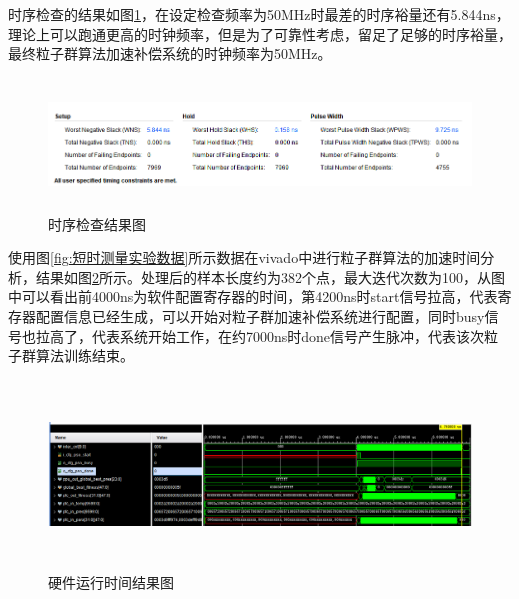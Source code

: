 时序检查的结果如图\ref{fig:时序检查结果图}，在设定检查频率为50MHz时最差的时序裕量还有5.844ns，理论上可以跑通更高的时钟频率，但是为了可靠性考虑，留足了足够的时序裕量，最终粒子群算法加速补偿系统的时钟频率为50MHz。
\begin{figure}[htb]
  \centering
  \includegraphics[width=14cm,height=3.5cm]{fig/6-fig/时序检查结果.png}
  \caption{时序检查结果图}
  \label{fig:时序检查结果图}
\end{figure}

使用图\ref{fig:短时测量实验数据}所示数据在vivado中进行粒子群算法的加速时间分析，结果如图\ref{fig:硬件运行时间结果图}所示。处理后的样本长度约为382个点，最大迭代次数为100，从图中可以看出前4000ns为软件配置寄存器的时间，第4200ns时start信号拉高，代表寄存器配置信息已经生成，可以开始对粒子群加速补偿系统进行配置，同时busy信号也拉高了，代表系统开始工作，在约7000ns时done信号产生脉冲，代表该次粒子群算法训练结束。
\begin{figure}[htb]
  \centering
  \includegraphics[width=14cm,height=5cm]{fig/6-fig/硬件运行时间.png}
  \caption{硬件运行时间结果图}
  \label{fig:硬件运行时间结果图}
\end{figure}


